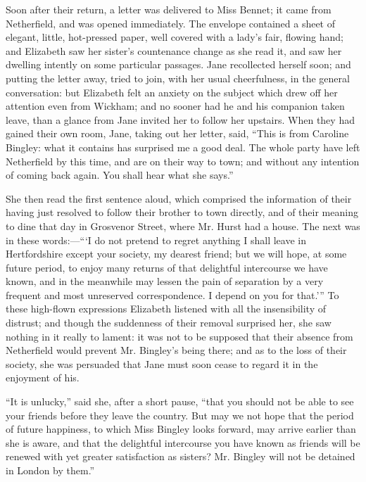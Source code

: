 \documentclass[12pt]{book}
\begin{document}
Soon after their return, a letter was delivered to Miss Bennet; it came from Netherfield, and was opened immediately. The envelope contained a sheet of elegant, little, hot-pressed paper, well covered with a lady's fair, flowing hand; and Elizabeth saw her sister's countenance change as she read it, and saw her dwelling intently on some particular passages. Jane recollected herself soon; and putting the letter away, tried to join, with her usual cheerfulness, in the general conversation: but Elizabeth felt an anxiety on the subject which drew off her attention even from Wickham; and no sooner had he and his companion taken leave, than a glance from Jane invited her to follow her upstairs. When they had gained their own room, Jane, taking out her letter, said, ``This is from Caroline Bingley: what it contains has surprised me a good deal. The whole party have left Netherfield by this time, and are on their way to town; and without any intention of coming back again. You shall hear what she says.''

She then read the first sentence aloud, which comprised the information of their having just resolved to follow their brother to town directly, and of their meaning to dine that day in Grosvenor Street, where Mr. Hurst had a house. The next was in these words:---```I do not pretend to regret anything I shall leave in Hertfordshire except your society, my dearest friend; but we will hope, at some future period, to enjoy many returns of that delightful intercourse we have known, and in the meanwhile may lessen the pain of separation by a very frequent and most unreserved correspondence. I depend on you for that.''' To these high-flown expressions Elizabeth listened with all the insensibility of distrust; and though the suddenness of their removal surprised her, she saw nothing in it really to lament: it was not to be supposed that their absence from Netherfield would prevent Mr. Bingley's being there; and as to the loss of their society, she was persuaded that Jane must soon cease to regard it in the enjoyment of his.

``It is unlucky,'' said she, after a short pause, ``that you should not be able to see your friends before they leave the country. But may we not hope that the period of future happiness, to which Miss Bingley looks forward, may arrive earlier than she is aware, and that the delightful intercourse you have known as friends will be renewed with yet greater satisfaction as sisters? Mr. Bingley will not be detained in London by them.''
\end{document}
